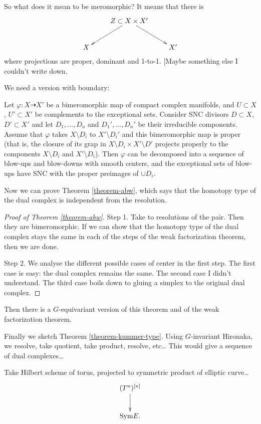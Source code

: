 \begin{remark}
\label{remark-meromorphic}
So what does it mean to be meromorphic? It means that there is
$$
\xymatrix{
&  Z \subset X \times X'\ar[dl]\ar[dr]\\
X & & X'
}
$$
where projections are proper, dominant and 1-to-1. [Maybe something
else I couldn't write down.
\end{remark}

\noindent
We need a version with boundary:

\begin{theorem}
\label{theorem-weak-factorization-for-pairs}
Let $\varphi:X \dashrightarrow X'$ be a bimeromorphic map
of compact complex manifolds, and $U \subset X$, $U' \subset X'$
be complements to the exceptional sets.
Consider SNC divisors $D \subset X$, $D' \subset X'$
and let $D_1,…, D_n$ and $D_1',…,D_n'$
be their irreducible components.
Assume that $\varphi$ takes $X\setminus D_i$
to $X' \setminus D_i'$
and this bimeromorphic map is proper
(that is, the closure of its grap in 
$X \setminus D_i \times X'\setminus D'$
projects properly to the components $X \setminus D_i$
and $X'\setminus D_i$).
Then $\varphi$ can be decomposed into a sequence
of blow-ups and blow-downs with smooth
centers, and the exceptional sets of blow-ups
have SNC with the proper preimages of $\cup  D_i$.
\end{theorem}

\noindent
Now we can prove Theorem \ref{theorem-abw},
which says that the homotopy type of the dual complex
is independent from the resolution.

\begin{proof}[Proof of Theorem \ref{theorem-abw}]
\noindent
Step 1. Take to resolutions of the pair.
Then they are bimeromorphic.
If we can show that the homotopy type of the dual
complex stays the same in each of the steps of the 
weak factorization theorem, then we are done.

\medskip\noindent
Step 2. We analyse the different possible cases of center in the 
first step. The first case is easy: the dual complex remains the same.
The second case I didn't understand.
The third case boils down to gluing a simplex to the 
original dual complex.
\end{proof}

\noindent
Then there is a $G$-equivariant version of this theorem
and of the weak factorization theorem.

\medskip\noindent
Finally we sketch Theorem \ref{theorem-kummer-type}.
Using $G$-invariant Hironaka, we
resolve, take quotient, take product, resolve, etc…
This would give a sequence of dual complexes…

\medskip\noindent
Take Hilbert scheme of torus, projected to symmetric
product of elliptic curve…
$$
\xymatrix{
(T^n)^{[n]}\ar[d]\\ \text{Sym}E.
}
$$




